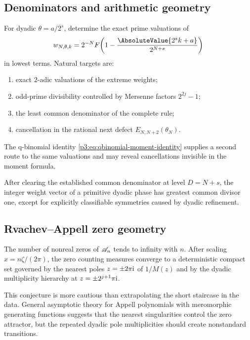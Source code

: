 \documentclass[11pt,oneside]{article}
\numberwithin{equation}{section}
\theoremstyle{definition}
\theoremstyle{remark}
\begin{document}
\subsection{Denominators and arithmetic geometry}

\begin{problem}
\label{p3:prob:weight-valuations}
For dyadic $\theta=a/2^s$, determine the exact prime valuations of
\[
 w_{N,\theta,k}=2^{-N}F\!\left(1-\frac{\AbsoluteValue{2^sk+a}}{2^{N+s}}\right)
\]
in lowest terms.  Natural targets are:
\begin{enumerate}
\item exact $2$-adic valuations of the extreme weights;
\item odd-prime divisibility controlled by Mersenne factors $2^{2j}-1$;
\item the least common denominator of the complete rule;
\item cancellation in the rational next defect $E_{N,N+2}(\theta_N)$.
\end{enumerate}
The q-binomial identity \eqref{p3:eq:qbinomial-moment-identity} supplies a second route to the same valuations and may reveal cancellations invisible in the moment formula.
\end{problem}

\begin{conjecture}
\label{p3:conj:primitive-rules}
After clearing the established common denominator at level $D=N+s$, the integer weight vector of a primitive dyadic phase has greatest common divisor one, except for explicitly classifiable symmetries caused by dyadic refinement.
\end{conjecture}

\subsection{Rvachev--Appell zero geometry}

\begin{conjecture}
\label{p3:conj:Appell-root-staircase}
The number of nonreal zeros of $\mathscr A_n$ tends to infinity with $n$.  After scaling $x=n\zeta/(2\pi)$, the zero counting measures converge to a deterministic compact set governed by the nearest poles $z=\pm2\pi\mathrm i$ of $1/M(z)$ and by the dyadic multiplicity hierarchy at $z=\pm2^{j+1}\pi\mathrm i$.
\end{conjecture}

This conjecture is more cautious than extrapolating the short staircase in the data.  General asymptotic theory for Appell polynomials with meromorphic generating functions suggests that the nearest singularities control the zero attractor, but the repeated dyadic pole multiplicities should create nonstandard transitions.
\end{document}
